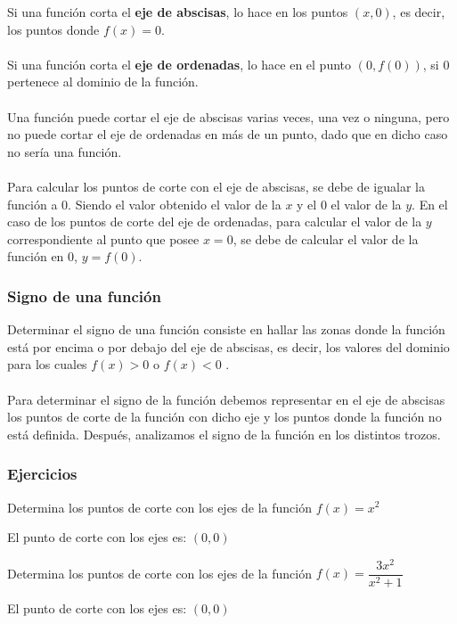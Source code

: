 
Si una función corta el \textbf{eje de abscisas}, lo hace en los puntos $(x, 0)$, es decir, los puntos donde $f(x)=0$.\\
\\
Si una función corta el \textbf{eje de ordenadas}, lo hace en el punto $(0, f(0))$, si $0$ pertenece al dominio de la función.\\
\\
Una función puede cortar el eje de abscisas varias veces, una vez o ninguna, pero no puede cortar el eje de ordenadas en más de un punto, dado que en dicho caso no sería una función.\\
\\
Para calcular los puntos de corte con el eje de abscisas, se debe de igualar la función a $0$. Siendo el valor obtenido el valor de la $x$ y el 0 el valor de la $y$. En el caso de los puntos de corte del eje de ordenadas, para calcular el valor de la $y$ correspondiente al punto que posee $x=0$, se debe de calcular el valor de la función en $0$, $y=f(0)$.\\
\subsubsection{Signo de una función}
Determinar el signo de una función consiste en hallar las zonas donde la función está por encima o por debajo del eje de abscisas, es decir, los valores del dominio para los cuales $f(x) > 0$ o $f(x) < 0$ .\\
\\
Para determinar el signo de la función debemos representar en el eje de abscisas los puntos de corte de la función con dicho eje y los puntos donde la función no está definida. Después, analizamos el signo de la función en los distintos trozos.
\subsubsection{Ejercicios}

\begin{ex}
	Determina los puntos de corte con los ejes de la función $f(x)=x^2$
	\begin{sol}
		El punto de corte con los ejes es: $(0,0)$
	\end{sol}
\end{ex}

\vspace{1cm}

\begin{ex}
	Determina los puntos de corte con los ejes de la función $f(x)=\dfrac{3x^2}{x^2+1}$
	\begin{sol}
		El punto de corte con los ejes es: $(0,0)$
		\geogebra{fd2tfayt}
	\end{sol}
\end{ex}

